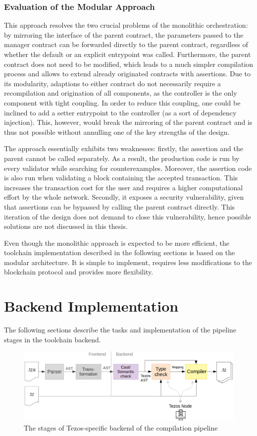 \subsubsection{Evaluation of the Modular Approach}
This approach resolves the two crucial problems of the monolithic orchestration: by mirroring the interface of the parent contract, the parameters passed to the manager contract can be forwarded directly to the parent contract, regardless of whether the default or an explicit entrypoint was called. Furthermore, the parent contract does not need to be modified, which leads to a much simpler compilation process and allows to extend already originated contracts with assertions. Due to its modularity, adaptions to either contract do not necessarily require a recompilation and origination of all components, as the controller is the only component with tight coupling. In order to reduce this coupling, one could be inclined to add a setter entrypoint to the controller (as a sort of dependency injection). This, however, would break the mirroring of the parent contract and is thus not possible without annulling one of the key strengths of the design.

The approach essentially exhibits two weaknesses: firstly, the assertion and the parent cannot be called separately. As a result, the production code is run by every validator while searching for counterexamples. Moreover, the assertion code is also run when validating a block containing the accepted transaction. This increases the transaction cost for the user and requires a higher computational effort by the whole network. Secondly, it exposes a security vulnerability, given that assertions can be bypassed by calling the parent contract directly. This iteration of the design does not demand to close this vulnerability, hence possible solutions are not discussed in this thesis.

Even though the monolithic approach is expected to be more efficient, the toolchain implementation described in the following sections is based on the modular architecture. It is simple to implement, requires less modifications to the blockchain protocol and provides more flexibility.

\section{Backend Implementation}\label{sec:backend_impl}
The following sections describe the tasks and implementation of the pipeline stages in the toolchain backend.
\begin{figure}[h]
\includegraphics[width=\linewidth]{figures/5-offline_tezos/pipeline_backend}
\caption{The stages of Tezos-specific backend of the compilation pipeline}
\label{fig:pipeline_backend}
\end{figure}

